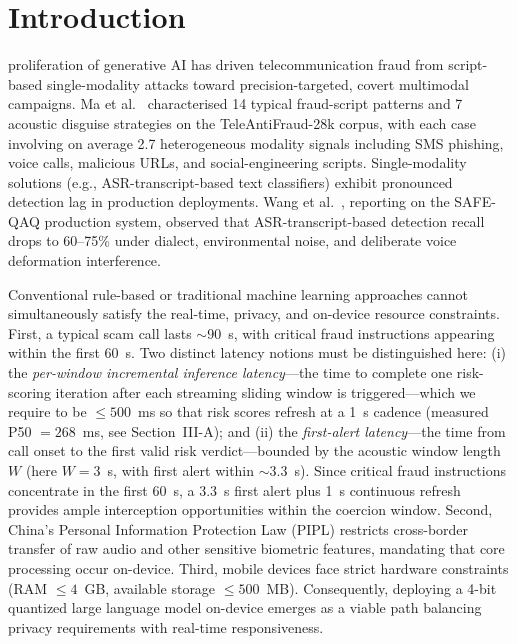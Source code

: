 \documentclass[lettersize,journal]{IEEEtran}
\begin{document}
\section{Introduction}
 proliferation of generative AI has driven telecommunication fraud from script-based single-modality attacks toward precision-targeted, covert multimodal campaigns. Ma et al.~\cite{1} characterised 14 typical fraud-script patterns and 7 acoustic disguise strategies on the TeleAntiFraud-28k corpus, with each case involving on average 2.7 heterogeneous modality signals including SMS phishing, voice calls, malicious URLs, and social-engineering scripts. Single-modality solutions (e.g., ASR-transcript-based text classifiers) exhibit pronounced detection lag in production deployments. Wang et al.~\cite{2}, reporting on the SAFE-QAQ production system, observed that ASR-transcript-based detection recall drops to 60--75\% under dialect, environmental noise, and deliberate voice deformation interference.

Conventional rule-based or traditional machine learning approaches cannot simultaneously satisfy the real-time, privacy, and on-device resource constraints. First, a typical scam call lasts $\sim$90~s, with critical fraud instructions appearing within the first 60~s. Two distinct latency notions must be distinguished here: (i) the \emph{per-window incremental inference latency}---the time to complete one risk-scoring iteration after each streaming sliding window is triggered---which we require to be $\le 500$~ms so that risk scores refresh at a 1~s cadence (measured P50 $=268$~ms, see Section~III-A); and (ii) the \emph{first-alert latency}---the time from call onset to the first valid risk verdict---bounded by the acoustic window length $W$ (here $W=3$~s, with first alert within $\sim$3.3~s). Since critical fraud instructions concentrate in the first 60~s, a 3.3~s first alert plus 1~s continuous refresh provides ample interception opportunities within the coercion window. Second, China's Personal Information Protection Law (PIPL) restricts cross-border transfer of raw audio and other sensitive biometric features, mandating that core processing occur on-device. Third, mobile devices face strict hardware constraints (RAM $\le 4$~GB, available storage $\le 500$~MB). Consequently, deploying a 4-bit quantized large language model on-device emerges as a viable path balancing privacy requirements with real-time responsiveness.
\end{document}
